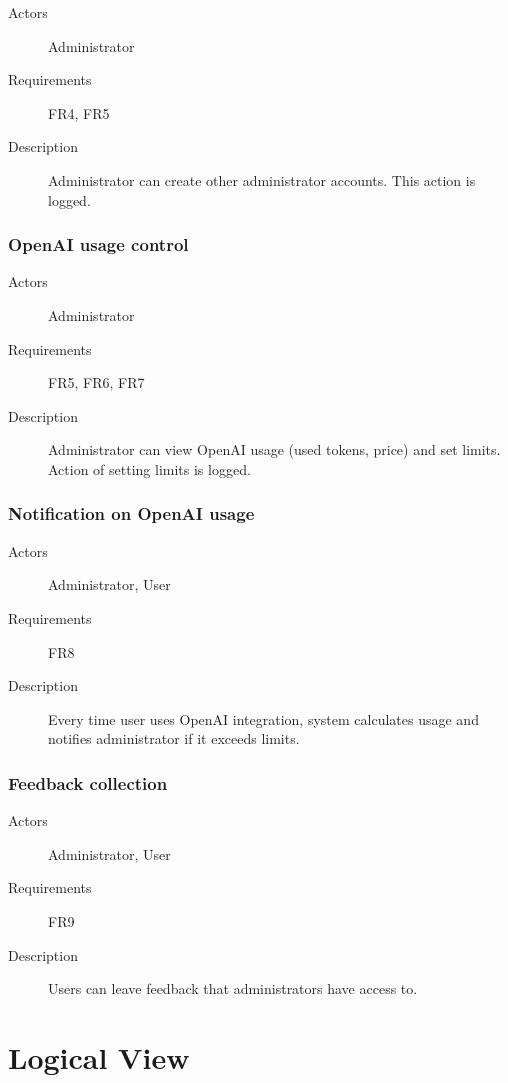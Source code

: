 \documentclass[
    english, %
]{VUMIFPSkursinis}
\begin{document}
\begin{description}
    \item[Actors] Administrator
    \item[Requirements] FR4, FR5
    \item[Description] Administrator can create other administrator accounts. This action is logged.
\end{description}

\subsubsection{OpenAI usage control}

\begin{description}
    \item[Actors] Administrator
    \item[Requirements] FR5, FR6, FR7
    \item[Description] Administrator can view OpenAI usage (used tokens, price) and set limits. Action of setting limits is logged.
\end{description}

\subsubsection{Notification on OpenAI usage}

\begin{description}
    \item[Actors] Administrator, User
    \item[Requirements] FR8
    \item[Description] Every time user uses OpenAI integration, system calculates usage and notifies administrator if it exceeds limits.
\end{description}

\subsubsection{Feedback collection}

\begin{description}
    \item[Actors] Administrator, User
    \item[Requirements] FR9
    \item[Description] Users can leave feedback that administrators have access to.
\end{description}

\section{Logical View}
\end{document}
